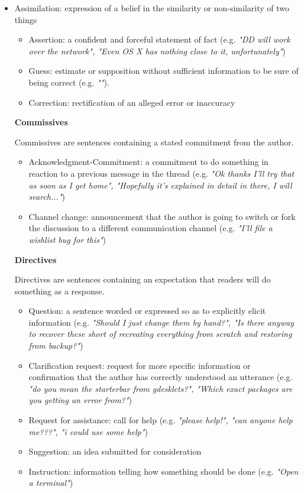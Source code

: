 \documentclass[11pt]{article}
\begin{document}
\begin{itemize}
\begin{itemize}
		\end{itemize}
	\item Assimilation: expression of a belief in the similarity or non-similarity of two things
		\begin{itemize}
	\item Assertion: a confident and forceful statement of fact (e.g. \textit{"DD will work over the network", "Even OS X has nothing close to it, unfortunately"})
	\item Guess: estimate or supposition without sufficient information to be sure of being correct (e.g. \textit{""}).
	\item Correction: rectification of an alleged error or inaccuracy
\end{itemize}

\textbf{Commissives}
\vspace{0.1cm}

Commissives are sentences containing a stated commitment from the author.

\begin{itemize}
	\item Acknowledgment-Commitment: a commitment to do something in reaction to a previous message in the thread (e.g. \textit{"Ok thanks I'll try that as soon as I get home", "Hopefully it's explained in detail in there, I will search..."})
	\item Channel change: announcement that the author is going to switch or fork the discussion to a different communication channel (e.g. \textit{"I'll file a wishlist bug for this"})
\end{itemize}

\textbf{Directives}
\vspace{0.1cm}

Directives are sentences containing an expectation that readers will do something as a response.

\begin{itemize}
	\item Question: a sentence worded or expressed so as to explicitly elicit information (e.g. \textit{"Should I just change them by hand?", "Is there anyway to recover these short of recreating everything from scratch and restoring from backup?"})
		\item Clarification request: request for more specific information or confirmation that the author has correctly understood an utterance (e.g. \textit{"do you mean the starterbar from gdesklets?", "Which exact packages are you getting an error from?"})
	\item Request for assistance: call for help (e.g. \textit{"please help!", "can anyone help me???", "i could use some help"})
	\item Suggestion: an idea submitted for consideration
	\item Instruction: information telling how something should be done (e.g. \textit{"Open a terminal"})
\end{itemize}


\end{itemize}
\end{document}
